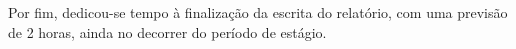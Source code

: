 Por fim, dedicou-se tempo à finalização da escrita do relatório, com uma previsão de 2 horas, ainda no decorrer do período de estágio.




